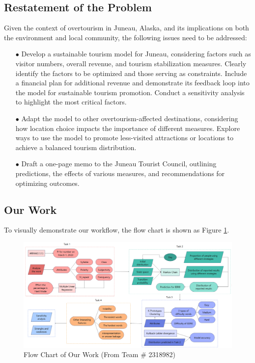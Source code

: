 \documentclass[12pt]{article}  %
\begin{document}
 \subsection{Restatement of the Problem}
 Given the context of overtourism in Juneau, Alaska, and its implications on both the environment and local community, the following issues need to be addressed:
 \begin{itemize}
    \item[$\bullet$]Develop a sustainable tourism model for Juneau, considering factors such as visitor numbers, overall revenue, and tourism stabilization measures. Clearly identify the factors to be optimized and those serving as constraints. Include a financial plan for additional revenue and demonstrate its feedback loop into the model for sustainable tourism promotion. Conduct a sensitivity analysis to highlight the most critical factors.
    \item[$\bullet$]Adapt the model to other overtourism-affected destinations, considering how location choice impacts the importance of different measures. Explore ways to use the model to promote less-visited attractions or locations to achieve a balanced tourism distribution.
    \item[$\bullet$]Draft a one-page memo to the Juneau Tourist Council, outlining predictions, the effects of various measures, and recommendations for optimizing outcomes.
 \end{itemize}
\subsection{Our Work}
 
To visually demonstrate our workflow, the flow chart is shown as Figure \ref{fig1}.
  
 
 
 \begin{figure}[H]  %
 
 \centering  %
 \includegraphics[width=.9\textwidth]{Flow_Chart.png} %
 \caption{Flow Chart of Our Work (From Team \# 2318982)} %
 \label{fig1}%
 \end{figure}
 
\end{document}

